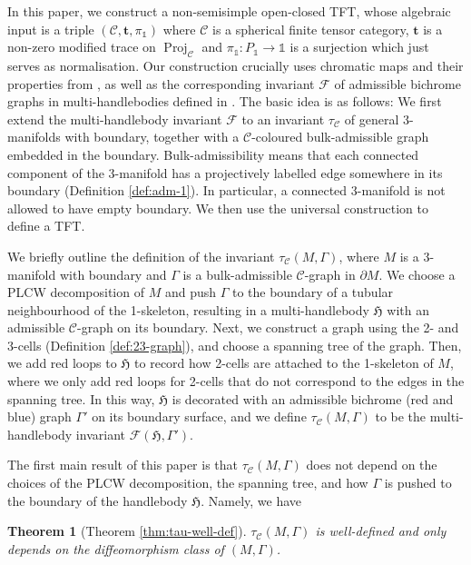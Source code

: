\documentclass[11pt]{amsart}
\newtheorem{thm}{Theorem}[section]
\theoremstyle{definition}
\numberwithin{equation}{section}
\def\bd{{\partial}}
\def\mtr{{\mathbf{t}}} %
\newcommand{\Proj}{\operatorname{Proj}}
\def\cgpt{\mathscr{F}}
\def\cC{\mathcal{C}}
\def\fH{\mathfrak{H}}
\def\1{{\mathds{1}}}
\def\to{\rightarrow}
\begin{document}
\vspace{0.8em}

In this paper, we construct a non-semisimple open-closed TFT, whose algebraic input is a triple $(\cC, \mtr, \pi_{\1})$ where $\cC$ is a spherical finite tensor category, $\mtr$ is a non-zero modified trace on $\Proj_{\cC}$ and $\pi_{\1}: P_{\1} \to \1$ is a surjection which just serves as normalisation. 
Our construction crucially uses chromatic maps and their properties from \cite{CGPV23}, as well as the corresponding invariant $\cgpt$ of admissible bichrome graphs in multi-handlebodies defined in \cite{CGPT20-Kup}. 
The basic idea is as follows: We first extend the multi-handlebody invariant $\cgpt$ to an invariant $\tau_{\cC}$ of general 3-manifolds with boundary, together with a $\cC$-coloured bulk-admissible graph embedded in the boundary. Bulk-admissibility means that each connected component of the 3-manifold has a projectively labelled edge somewhere in its boundary (Definition \ref{def:adm-1}). In particular, a connected 3-manifold is not allowed to have empty boundary.
We then use the universal construction \cite{BHMV2} to define a TFT. 

We briefly outline the definition of the invariant $\tau_{\cC}(M, \Gamma)$, where $M$ is a 3-manifold with boundary and $\Gamma$ is a bulk-admissible $\cC$-graph in $\bd M$. We choose a PLCW decomposition of $M$ and push $\Gamma$ to the boundary of a tubular neighbourhood of the 1-skeleton, resulting in a multi-handlebody $\fH$ with an admissible $\cC$-graph on its boundary. Next, we construct a graph using the 2- and 3-cells (Definition \ref{def:23-graph}), and choose a spanning tree of the graph. Then, we add red loops to $\fH$ to record how 2-cells are attached to the 1-skeleton of $M$, where we only add red loops for 2-cells that do not correspond to the edges in the spanning tree. In this way, 
$\fH$ is decorated with an admissible bichrome (red and blue) graph $\Gamma'$ on its boundary surface, and we define $\tau_{\cC}(M, \Gamma)$ to be the multi-handlebody
invariant $\cgpt(\fH, \Gamma')$. 

The first main result of this paper is that $\tau_{\cC}(M, \Gamma)$ does not depend on the choices of the PLCW decomposition, the spanning tree, and how $\Gamma$ is pushed to the boundary of the handlebody $\fH$. Namely, we have

\begin{thm}[Theorem \ref{thm:tau-well-def}]
$\tau_{\cC}(M, \Gamma)$ is well-defined and only depends on the diffeomorphism class of $(M, \Gamma)$.
\end{thm}
\end{document}
